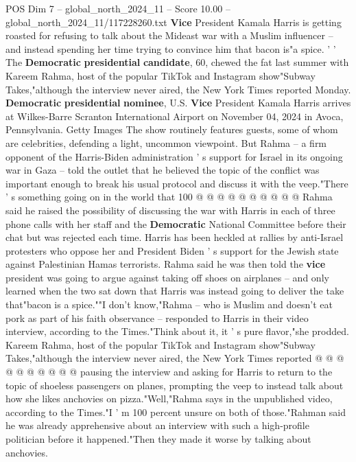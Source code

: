 \begin{textsample}{POS Dim 7 – global\_north\_2024\_11 – Score 10.00 – global\_north\_2024\_11/117228260.txt}  \label{ex:f7_pos_120}
\textbf{Vice} President Kamala Harris is getting roasted for refusing to talk about the Mideast war with a Muslim influencer -- and instead spending her time trying to convince him that bacon is"a spice. ' ' The \textbf{Democratic} \textbf{presidential} \textbf{candidate}, 60, chewed the fat last summer with Kareem Rahma, host of the popular TikTok and Instagram show"Subway Takes,"although the interview never aired, the New York Times reported Monday. \textbf{Democratic} \textbf{presidential} \textbf{nominee}, U.S. \textbf{Vice} President Kamala Harris arrives at Wilkes-Barre Scranton International Airport on November 04, 2024 in Avoca, Pennsylvania.
Getty Images The show routinely features guests, some of whom are celebrities, defending a light, uncommon viewpoint.
But Rahma -- a firm opponent of the Harris-Biden administration ' s support for Israel in its ongoing war in Gaza -- told the outlet that he believed the topic of the conflict was important enough to break his usual protocol and discuss it with the veep."There ' s something going on in the world that 100 @ @ @ @ @ @ @ @ @ @ Rahma said he raised the possibility of discussing the war with Harris in each of three phone calls with her staff and the \textbf{Democratic} National Committee before their chat but was rejected each time.
Harris has been heckled at rallies by anti-Israel protesters who oppose her and President Biden ' s support for the Jewish state against Palestinian Hamas terrorists.
Rahma said he was then told the \textbf{vice} president was going to argue against taking off shoes on airplanes -- and only learned when the two sat down that Harris was instead going to deliver the take that"bacon is a spice.""I don't know,"Rahma -- who is Muslim and doesn't eat pork as part of his faith observance -- responded to Harris in their video interview, according to the Times."Think about it, it ' s pure flavor,"she prodded.
Kareem Rahma, host of the popular TikTok and Instagram show"Subway Takes,"although the interview never aired, the New York Times reported @ @ @ @ @ @ @ @ @ @ pausing the interview and asking for Harris to return to the topic of shoeless passengers on planes, prompting the veep to instead talk about how she likes anchovies on pizza."Well,"Rahma says in the unpublished video, according to the Times."I ' m 100 percent unsure on both of those."Rahman said he was already apprehensive about an interview with such a high-profile politician before it happened."Then they made it worse by talking about anchovies.

\end{textsample}

